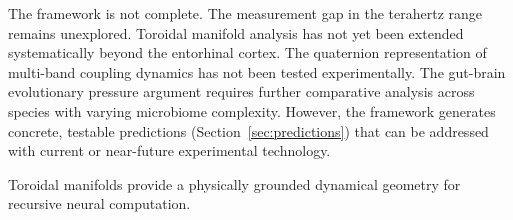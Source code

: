 \documentclass[12pt,a4paper]{article}
\begin{document}
The framework is not complete.
The measurement gap in the terahertz range remains unexplored.
Toroidal manifold analysis has not yet been extended systematically beyond the entorhinal cortex.
The quaternion representation of multi-band coupling dynamics has not been tested experimentally.
The gut-brain evolutionary pressure argument requires further comparative analysis across species with varying microbiome complexity.
However, the framework generates concrete, testable predictions (Section~\ref{sec:predictions}) that can be addressed with current or near-future experimental technology.

Toroidal manifolds provide a physically grounded dynamical geometry for recursive neural computation.



\end{document}
